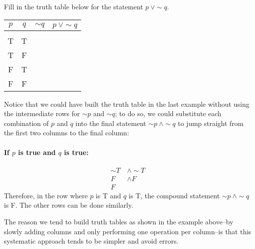 \begin{try}
Fill in the truth table below for the statement $p\ \vee \sim q$.
\begin{center}
\begin{tabular}{|c c c c|}
\hline
$p$ & $q$ & $\sim q$ & $p\ \vee \sim q$\\
\hline
& & &\\
T & T & & \\
T & F & & \\
F & T & & \\
F & F & & \\
\hline
\end{tabular}
\end{center}
\end{try}

Notice that we could have built the truth table in the last example without using the intermediate rows for $\sim p$ and $\sim q$; to do so, we could substitute each combination of $p$ and $q$ into the final statement $\sim p\ \wedge \sim q$ to jump straight from the first two columns to the final column:
\paragraph{If $p$ is true and $q$ is true:}
\begin{align*}
\sim T\ &\wedge \sim T\\
F\ &\wedge F\\
F
\end{align*}
Therefore, in the row where $p$ is T and $q$ is T, the compound statement $\sim p\ \wedge \sim q$ is F.  The other rows can be done similarly.

The reason we tend to build truth tables as shown in the example above--by slowly adding columns and only performing one operation per column--is that this systematic approach tends to be simpler and avoid errors.
\pagebreak
\text{}
\vfill

